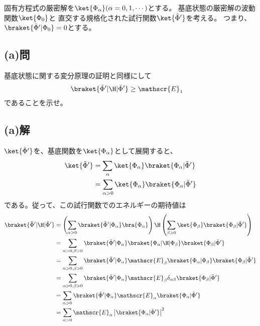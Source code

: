 固有方程式の厳密解を$\ket{\Phi_{\alpha}}(\alpha=0,1,\cdots)$とする。
基底状態の厳密解の波動関数$\ket{\Phi_0}$と
直交する規格化された試行関数$\ket{\tilde{\Phi}'}$を考える。
つまり、$\braket{\tilde{\Phi}'|\Phi_0}=0$とする。

\subsection{(a)問}
基底状態に関する変分原理の証明と同様にして
\begin{align}
	\braket{\tilde{\Phi}'|\H|\tilde{\Phi}'}
&\geq
	\mathscr{E}_1
\end{align}
であることを示せ。

\subsection{(a)解}
$\ket{\tilde{\Phi}'}$を、基底関数を$\ket{\Phi_{\alpha}}$として展開すると、
\begin{align}
	\ket{\tilde{\Phi}'}
&=
	\sum_{\alpha} \ket{\Phi_{\alpha}} \braket{\Phi_{\alpha}|\tilde{\Phi}'} \\
%
%
&=
	\sum_{\alpha>0} \ket{\Phi_{\alpha}} \braket{\Phi_{\alpha}|\tilde{\Phi}'}
\end{align}
である。従って、この試行関数でのエネルギーの期待値は
\begin{align}
	\braket{\tilde{\Phi}'|\H|\tilde{\Phi}'}
&=
	\left(
		\sum_{\alpha>0}
			\braket{\tilde{\Phi}'|\Phi_{\alpha}} \bra{\Phi_{\alpha}}
	\right)
		\H
		\left(
			\sum_{\beta>0}
				\ket{\Phi_{\beta}} \braket{\Phi_{\beta}|\tilde{\Phi}'}
		\right) \\
%
%
&=
	\sum_{\alpha>0,\beta>0}
		\braket{\tilde{\Phi}'|\Phi_{\alpha}}
			\braket{\Phi_{\alpha}|\H|\Phi_{\beta}}
			\braket{\Phi_{\beta}|\tilde{\Phi}'} \\
%
%
&=
	\sum_{\alpha>0,\beta>0}
		\braket{\tilde{\Phi}'|\Phi_{\alpha}}
			\mathscr{E}_{\beta} \braket{\Phi_{\alpha}|\Phi_{\beta}}
			\braket{\Phi_{\beta}|\tilde{\Phi}'} \\
%
%
&=
	\sum_{\alpha>0,\beta>0}
		\braket{\tilde{\Phi}'|\Phi_{\alpha}}
			\mathscr{E}_{\beta} \delta_{\alpha\beta}
			\braket{\Phi_{\beta}|\tilde{\Phi}'} \\
%
%
&=
	\sum_{\alpha>0}
		\braket{\tilde{\Phi}'|\Phi_{\alpha}}
			\mathscr{E}_{\alpha}
			\braket{\Phi_{\alpha}|\tilde{\Phi}'} \\
%
%
&=
	\sum_{\alpha>0}
		\mathscr{E}_{\alpha}
			\left|\braket{\Phi_{\alpha}|\tilde{\Phi}'}\right|^2
\end{align}
